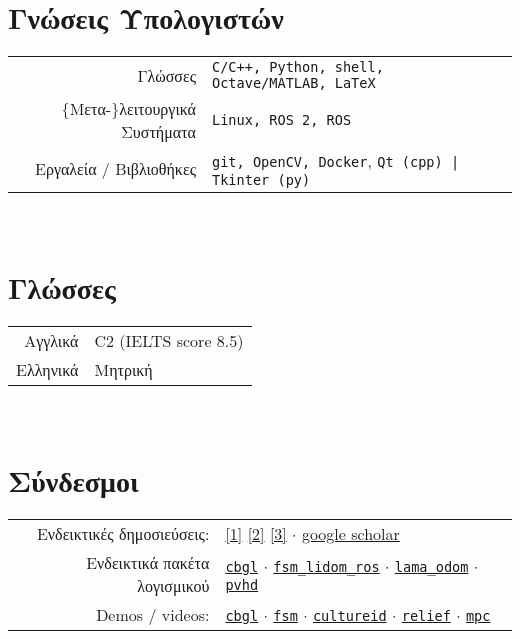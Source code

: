 \documentclass[a4paper,10pt,twoside]{article}
\begin{document}
\section{Γνώσεις Υπολογιστών}

\begin{tabular}{rp{9cm}}
Γλώσσες                             & \texttt{C/C++, Python, shell, Octave/MATLAB, LaTeX} \\
$\{$Μετα-$\}$λειτουργικά Συστήματα  & \texttt{Linux, ROS 2, ROS} \\
  Εργαλεία / Βιβλιοθήκες            & \texttt{git, OpenCV, Docker}, \texttt{Qt (cpp) | Tkinter (py)}
\end{tabular} \\



\section{Γλώσσες}
\begin{tabular}{rp{12cm}}
Αγγλικά & C2 (IELTS score 8.5) \\
Ελληνικά & Μητρική
\end{tabular} \\


\section{Σύνδεσμοι}

\begin{tabular}{rp{12cm}}
  Ενδεικτικές δημοσιεύσεις: &
\href{https://ieeexplore.ieee.org/abstract/document/9981228}{[1]}
\href{https://www.sciencedirect.com/science/article/abs/pii/S0921889021002323}{[2]}
\href{https://www.tandfonline.com/doi/full/10.1080/00207179.2018.1514129}{[3]} $\cdot$ \href{https://scholar.google.com/citations?view\_op=list\_works\&hl=en\&user=9\_hI4hMAAAAJ}{google scholar}\\

  Ενδεικτικά πακέτα λογισμικού&
\href{https://github.com/li9i/cbgl}{\texttt{cbgl}} $\cdot$
\href{https://github.com/li9i/fsm\_lidom\_ros}{\texttt{fsm\_lidom\_ros}} $\cdot$
\href{https://github.com/li9i/lama\_odom}{\texttt{lama\_odom}} $\cdot$
\href{https://github.com/li9i/pandora\_vision\_2014/tree/hydro-devel/pandora\_vision\_hole\_detector}{\texttt{pvhd}} \\

  Demos / videos: & \href{https://www.youtube.com/watch?v=xaDKjI0WkDc}{\texttt{cbgl}} $\cdot$ \href{https://www.youtube.com/watch?v=hB4qsHCEXGI}{\texttt{fsm}} $\cdot$ \href{https://cultureid.web.auth.gr/?page\_id=200&lang=en}{\texttt{cultureid}} $\cdot$ \href{https://relief.web.auth.gr/}{\texttt{relief}} $\cdot$ \href{https://www.youtube.com/watch?v=937OZez1iN8}{\texttt{mpc}}
\end{tabular}
\\
\end{document}
